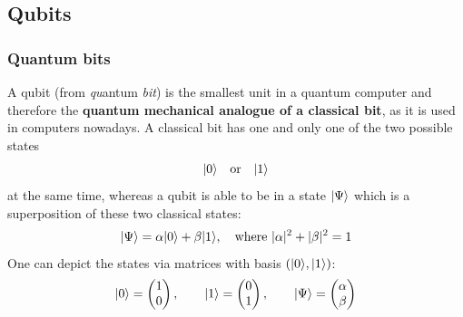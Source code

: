 \documentclass[bibliography=totocnumbered, 10pt]{article}
\theoremstyle{NoticeStyle}
\begin{document}
\subsection{Qubits}\label{sec:Qubits}

\subsubsection{Quantum bits}
A qubit (from \textit{qu}antum \textit{bit}) is the smallest unit in a quantum computer and therefore the \textbf{quantum mechanical analogue of a classical bit}, as it is used in computers nowadays. A classical bit has one and only one of the two possible states
%
\begin{align}
	{\left\vert{0}\right\rangle} \quad \text{or} \quad {\left\vert{1}\right\rangle}
\end{align}
%
at the same time, whereas a qubit is able to be in a state ${\left\vert{\Psi}\right\rangle}$ which is a superposition of these two classical states:
%
\begin{align}
	{\left\vert{\Psi}\right\rangle} = \alpha {\left\vert{0}\right\rangle} + \beta {\left\vert{1}\right\rangle}, \quad \text{where }|\alpha|^2 + |\beta|^2 = 1	\label{eq:Superpos of qubit}
\end{align}
%
%
One can depict the states via matrices with basis $({\left\vert{0}\right\rangle}, {\left\vert{1}\right\rangle})$:
\begin{align}
	{\left\vert{0}\right\rangle} = \begin{pmatrix}1\\0 \end{pmatrix}, \quad\quad {\left\vert{1}\right\rangle} = \begin{pmatrix}0\\1 \end{pmatrix}, \quad\quad {\left\vert{\Psi}\right\rangle} = \begin{pmatrix}\alpha\\\beta \end{pmatrix}
\end{align}
\end{document}
